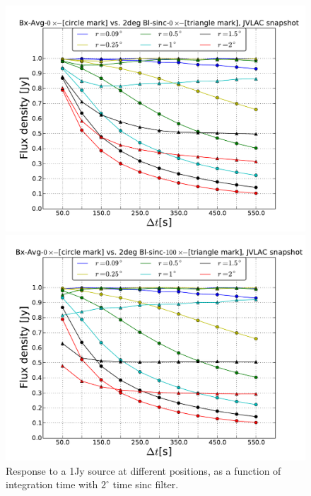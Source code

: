 \documentclass[useAMS,usenatbib]{mn2e}
\begin{document}
\begin{figure}
  \centering
\begin{minipage}{0.38\linewidth}\includegraphics[width=1.\textwidth]{./Figures/max-integ-time-sinc-w1x1-fov2.pdf}
	\caption{Response to a 1Jy source at different positions, as a function of integration time with $2^{\circ}$ time sinc filter.}
	\label{fig:max-integ-time-sinc-w1x1-fov2}
	\end{minipage} \hspace{1cm}
\begin{minipage}{0.38\linewidth}\includegraphics[width=1.\textwidth]{./Figures/max-integ-time-sinc-w100x1-fov2.pdf}

\end{minipage}
\end{figure}
\end{document}

